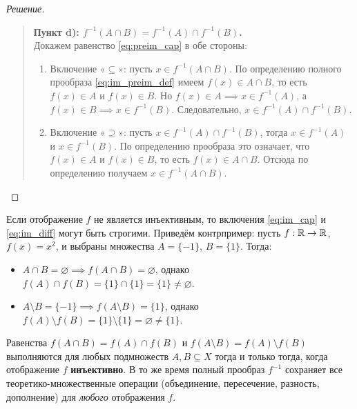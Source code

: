\begin{proof}[Решение]
\begin{quote}
        \textbf{Пункт d): $f^{-1}(A \cap B) = f^{-1}(A) \cap f^{-1}(B)$.}\\
        Докажем равенство \eqref{eq:preim_cap} в обе стороны:
        \begin{enumerate}
            \item Включение «$\subseteq$»: пусть $x \in f^{-1}(A \cap B)$. 
            По определению полного прообраза \eqref{eq:im_preim_def} имеем 
            $f(x) \in A \cap B$, то есть $f(x) \in A$ и $f(x) \in B$. Но 
            $f(x) \in A \implies x \in f^{-1}(A)$, а 
            $f(x) \in B \implies x \in f^{-1}(B)$. Следовательно, 
            $x \in f^{-1}(A) \cap f^{-1}(B)$.
            \item Включение «$\supseteq$»: пусть 
            $x \in f^{-1}(A) \cap f^{-1}(B)$, тогда $x \in f^{-1}(A)$ и 
            $x \in f^{-1}(B)$. По определению прообраза это означает, что 
            $f(x) \in A$ и $f(x) \in B$, то есть $f(x) \in A \cap B$. 
            Отсюда по определению получаем $x \in f^{-1}(A \cap B)$.
        \end{enumerate}
    \end{quote}
\end{proof}

\begin{remark}
    Если отображение $f$ не является инъективным, то включения 
    \eqref{eq:im_cap} и \eqref{eq:im_diff} могут быть строгими. Приведём 
    контрпример: пусть $f: \mathbb{R} \to \mathbb{R}$, $f(x) = x^2$, и выбраны множества 
    $A = \{-1\}$, $B = \{1\}$. Тогда:
    \begin{itemize}
        \item $A \cap B = \varnothing \implies f(A \cap B) = \varnothing$, 
        однако $f(A) \cap f(B) = \{1\} \cap \{1\} = \{1\} \neq \varnothing$.
        \item $A \setminus B = \{-1\} \implies f(A \setminus B) = \{1\}$, 
        однако $f(A) \setminus f(B) = \{1\} \setminus \{1\} = \varnothing \neq \{1\}$.
    \end{itemize}
    Равенства $f(A \cap B) = f(A) \cap f(B)$ и 
    $f(A \setminus B) = f(A) \setminus f(B)$ выполняются для любых 
    подмножеств $A, B \subseteq X$ тогда и только тогда, когда отображение 
    $f$ \textbf{инъективно}. В то же время полный прообраз $f^{-1}$ 
    сохраняет все теоретико-множественные операции (объединение, 
    пересечение, разность, дополнение) для \emph{любого} отображения $f$.
\end{remark}

